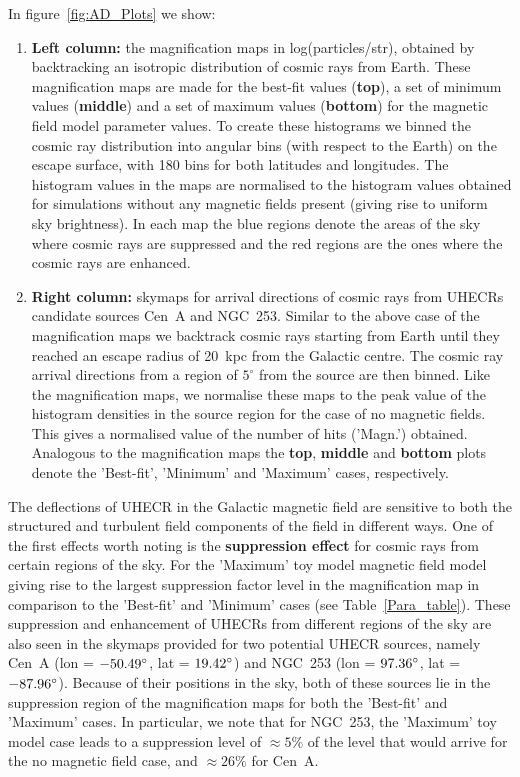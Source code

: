 \documentclass[usenatbib]{mnras}
\begin{document}
In figure~\ref{fig:AD_Plots} we show:

\begin{enumerate}
    \item {\bf Left column: } the magnification maps in log(particles/str), obtained by backtracking an isotropic distribution of cosmic rays from Earth. These magnification maps are made for the best-fit values (\textbf{top}), a set of minimum values (\textbf{middle}) and a set of maximum values (\textbf{bottom}) for the magnetic field model parameter values.
    To create these histograms we binned the cosmic ray distribution into angular bins (with respect to the Earth) on the escape surface, with 180 bins for both latitudes and longitudes. The histogram values in the maps are normalised to the histogram values obtained for simulations without any magnetic fields present (giving rise to uniform sky brightness). In each map the blue regions denote the areas of the sky where cosmic rays are suppressed and the red regions are the ones where the cosmic rays are enhanced.
    
    \item {\bf Right column: } skymaps for arrival directions
    of cosmic rays from UHECRs candidate sources Cen~A and NGC~253. Similar to the above case of the magnification maps we backtrack cosmic rays starting from Earth until they reached an escape radius of 20~kpc from the Galactic centre. The cosmic ray arrival directions from a region of $5^{\circ}$ from the source are then binned.  Like the magnification maps, we normalise these maps to the peak value of the histogram densities in the source region for the case of no magnetic fields.  This gives a normalised value of the number of hits ('Magn.') obtained. Analogous to the magnification maps the \textbf{top}, \textbf{middle} and \textbf{bottom} plots denote the 'Best-fit', 'Minimum' and 'Maximum' cases, respectively. 
    \end{enumerate}

The deflections of UHECR in the Galactic magnetic field are sensitive to both the structured and turbulent field components of the field in different ways. One of the first effects worth noting is the {\bf suppression effect} for cosmic rays from certain regions of the sky. For the 'Maximum' toy model magnetic field model giving rise to the largest suppression factor level in the magnification map in comparison to the 'Best-fit' and 'Minimum' cases (see Table~\ref{Para_table}). These suppression and enhancement of UHECRs from different regions of the sky are also seen in the skymaps provided for two potential UHECR sources, namely Cen~A (lon = $\rm -50.49^{\circ}$, lat = $\rm 19.42^{\circ}$) and NGC~253 (lon = $\rm 97.36^{\circ}$, lat = $\rm -87.96^{\circ}$). Because of their positions in the sky, both of these sources lie in the suppression region of the magnification maps for both the 'Best-fit' and 'Maximum' cases. In particular, we note that for NGC~253, the 'Maximum' toy model case leads to a suppression level of $\approx 5\%$ of the level that would arrive for the no magnetic field case, and $\approx 26\%$ for Cen~A.
\end{document}
